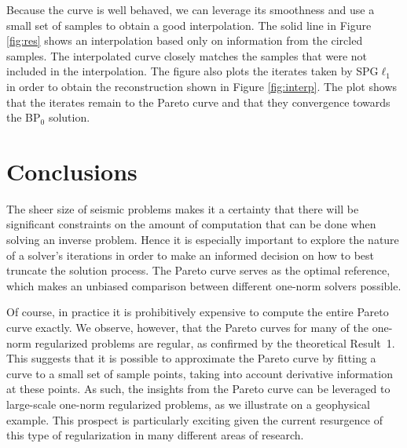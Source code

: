 Because the curve is well behaved, we can leverage its smoothness and
use a small set of samples to obtain a good interpolation. The solid
line in Figure \ref{fig:res} shows an interpolation based only on
information from the circled samples. The interpolated curve closely
matches the samples that were not included in the interpolation. The
figure also plots the iterates taken by SPG$\ell_1$ in order to obtain
the reconstruction shown in Figure \ref{fig:interp}. The plot shows
that the iterates remain to the Pareto curve and that they convergence
towards the BP$_0$ solution.



\section{Conclusions}
%
\mbox{}\indent The sheer size of seismic problems makes it a certainty
that there will be significant constraints on the amount of
computation that can be done when solving an inverse problem.  Hence
it is especially important to explore the nature of a solver's
iterations in order to make an informed decision on how to best
truncate the solution process. The Pareto curve serves as the optimal
reference, which makes an unbiased comparison between different
one-norm solvers possible.

Of course, in practice it is prohibitively expensive to compute the
entire Pareto curve exactly. We observe, however, that the Pareto
curves for many of the one-norm regularized problems are regular, as
confirmed by the theoretical Result~1. This suggests that it is
possible to approximate the Pareto curve by fitting a curve to a small
set of sample points, taking into account derivative information at
these points. As such, the insights from the Pareto curve can be
leveraged to large-scale one-norm regularized problems, as we
illustrate on a geophysical example.  This prospect is particularly
exciting given the current resurgence of this type of regularization
in many different areas of research.

